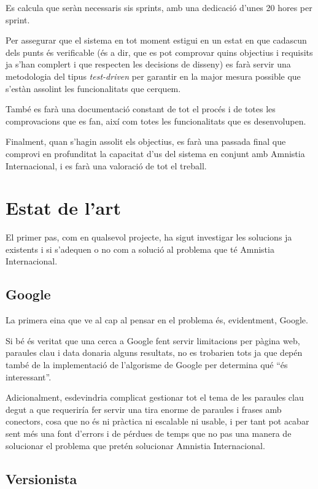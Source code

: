\documentclass{article}
\begin{document}
Es calcula que seràn necessaris sis sprints, amb una dedicació d'unes 20 hores per sprint.

Per assegurar que el sistema en tot moment estigui en un estat en que cadascun dels punts és verificable (és a dir, que es pot comprovar quins objectius i requisits ja s'han complert i que respecten les decisions de disseny) es farà servir una metodologia del tipus \emph{test-driven} per garantir en la major mesura possible que s'estàn assolint les funcionalitats que cerquem.

També es farà una documentació constant de tot el procés i de totes les comprovacions que es fan, així com totes les funcionalitats que es desenvolupen.

Finalment, quan s'hagin assolit els objectius, es farà una passada final que comprovi en profunditat la capacitat d'us del sistema en conjunt amb Amnistia Internacional, i es farà una valoració de tot el treball.

\newpage

\section{Estat de l'art}

El primer pas, com en qualsevol projecte, ha sigut investigar les solucions ja existents i si s'adequen o no com a solució al problema que té Amnistia Internacional.

\subsection{Google}

La primera eina que ve al cap al pensar en el problema és, evidentment, Google.

Si bé és veritat que una cerca a Google fent servir limitacions per pàgina web, paraules clau i data donaria alguns resultats, no es trobarien tots ja que depén també de la implementació de l'algorisme de Google per determina qué ``és interessant''.

Adicionalment, esdevindria complicat gestionar tot el tema de les paraules clau degut a que requeriría fer servir una tira enorme de paraules i frases amb conectors, cosa que no és ni pràctica ni escalable ni usable, i per tant pot acabar sent més una font d'errors i de pérdues de temps que no pas una manera de solucionar el problema que pretén solucionar Amnistia Internacional.

\subsection{Versionista}
\end{document}
